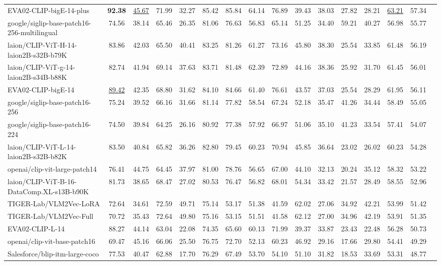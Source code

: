 \begin{table*}[!htp]
{\begin{tabular}{lcccccccccc|cc|ccc}
EVA02-CLIP-bigE-14-plus &\textbf{92.38} &\underline{45.67} &71.99 &32.27 &85.42 &85.84 &64.14 &76.89 &39.43 &38.03 &27.82 &28.21 &\underline{63.21} &57.34 \\
google/siglip-base-patch16-256-multilingual &74.56 &38.14 &65.46 &26.35 &81.06 &76.63 &56.83 &65.14 &51.25 &34.40 &59.21 &40.27 &56.98 &55.77 \\
laion/CLIP-ViT-H-14-laion2B-s32B-b79K &83.86 &42.03 &65.50 &40.41 &83.25 &81.26 &61.27 &73.16 &45.80 &38.30 &25.54 &33.85 &61.48 &56.19 \\
laion/CLIP-ViT-g-14-laion2B-s34B-b88K &82.74 &41.94 &69.14 &37.63 &83.71 &81.48 &62.39 &72.89 &44.16 &38.36 &25.92 &31.70 &61.45 &56.01 \\
EVA02-CLIP-bigE-14 &\underline{89.42} &42.35 &68.80 &31.62 &84.10 &84.66 &61.40 &76.61 &43.57 &37.03 &25.54 &28.29 &61.95 &56.11 \\
google/siglip-base-patch16-256 &75.24 &39.52 &66.16 &31.66 &81.14 &77.82 &58.54 &67.24 &52.18 &35.47 &41.26 &34.44 &58.49 &55.05 \\
google/siglip-base-patch16-224 &74.50 &39.84 &64.25 &26.16 &80.92 &77.38 &57.92 &66.97 &51.06 &35.10 &41.23 &33.54 &57.41 &54.07 \\
laion/CLIP-ViT-L-14-laion2B-s32B-b82K &83.50 &40.84 &65.82 &36.26 &82.80 &79.45 &60.23 &70.94 &45.85 &36.64 &23.02 &26.02 &60.23 &54.28 \\
openai/clip-vit-large-patch14 &76.41 &44.75 &64.45 &37.97 &81.00 &78.76 &56.65 &67.00 &44.10 &32.13 &20.24 &35.12 &58.32 &53.22 \\
laion/CLIP-ViT-B-16-DataComp.XL-s13B-b90K &81.73 &38.65 &68.47 &27.02 &80.53 &76.47 &56.82 &68.01 &54.34 &33.42 &21.57 &28.49 &58.55 &52.96 \\
TIGER-Lab/VLM2Vec-LoRA &72.64 &34.61 &72.59 &49.71 &75.14 &53.17 &51.38 &41.59 &62.02 &27.06 &34.92 &42.21 &53.99 &51.42 \\
TIGER-Lab/VLM2Vec-Full &70.72 &35.43 &72.64 &49.80 &75.16 &53.15 &51.51 &41.58 &62.12 &27.00 &34.96 &42.19 &53.91 &51.35 \\
EVA02-CLIP-L-14 &88.27 &44.14 &63.04 &22.08 &74.35 &65.60 &60.13 &71.99 &39.37 &33.87 &23.43 &22.48 &56.28 &50.73 \\
openai/clip-vit-base-patch16 &69.47 &45.16 &66.06 &25.50 &76.75 &72.70 &52.13 &60.23 &46.92 &29.16 &17.66 &29.80 &54.41 &49.29 \\
Salesforce/blip-itm-large-coco &77.53 &40.47 &62.88 &17.70 &76.29 &67.49 &53.70 &54.10 &51.10 &31.82 &18.53 &33.69 &53.31 &48.77 \\

\end{tabular}}
\end{table*}
